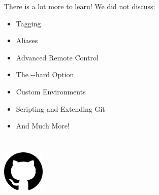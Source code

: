 
\begin{frame}
There is a lot more to learn! We did not discuss:
\begin{itemize}
\item Tagging
\item Aliases
\item Advanced Remote Control
\item The -{}-hard Option
\item Custom Environments
\item Scripting and Extending Git
\item And Much More!
\end{itemize}
\end{frame}
\note{}

\begin{frame}
\frametitle{\large{}}
\begin{center}
\huge{\color{RUBblau}{Thank You For Your Attention.}}\\
\vspace{6mm} \includegraphics[width=0.15\textwidth]{img/github_logos/Octicons-mark-github}
\end{center}
\end{frame}
\note{}